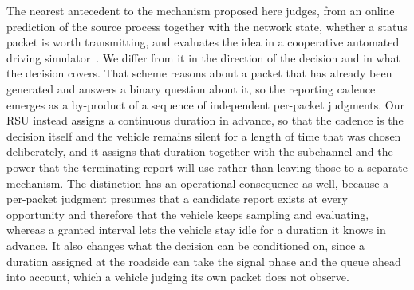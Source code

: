 \documentclass[journal]{IEEEtran}
\begin{document}
The nearest antecedent to the mechanism proposed here judges, from an online prediction of the source process together with the network state, whether a status packet is worth transmitting, and evaluates the idea in a cooperative automated driving simulator~\cite{jiang2021}. We differ from it in the direction of the decision and in what the decision covers. That scheme reasons about a packet that has already been generated and answers a binary question about it, so the reporting cadence emerges as a by-product of a sequence of independent per-packet judgments. Our RSU instead assigns a continuous duration in advance, so that the cadence is the decision itself and the vehicle remains silent for a length of time that was chosen deliberately, and it assigns that duration together with the subchannel and the power that the terminating report will use rather than leaving those to a separate mechanism. The distinction has an operational consequence as well, because a per-packet judgment presumes that a candidate report exists at every opportunity and therefore that the vehicle keeps sampling and evaluating, whereas a granted interval lets the vehicle stay idle for a duration it knows in advance. It also changes what the decision can be conditioned on, since a duration assigned at the roadside can take the signal phase and the queue ahead into account, which a vehicle judging its own packet does not observe.
\end{document}

